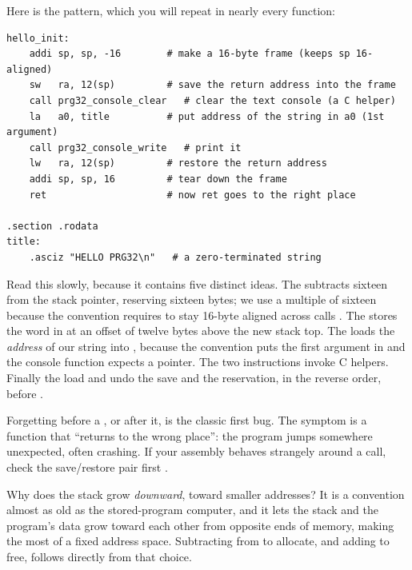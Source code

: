 Here is the pattern, which you will repeat in nearly every function:

\begin{lstlisting}[style=asm,caption={The stack-frame idiom. Save \reg{ra}, do work that may call C, restore \reg{ra}, return.}]
hello_init:
    addi sp, sp, -16        # make a 16-byte frame (keeps sp 16-aligned)
    sw   ra, 12(sp)         # save the return address into the frame
    call prg32_console_clear   # clear the text console (a C helper)
    la   a0, title          # put address of the string in a0 (1st argument)
    call prg32_console_write   # print it
    lw   ra, 12(sp)         # restore the return address
    addi sp, sp, 16         # tear down the frame
    ret                     # now ret goes to the right place

.section .rodata
title:
    .asciz "HELLO PRG32\n"   # a zero-terminated string
\end{lstlisting}

Read this slowly, because it contains five distinct ideas. The  subtracts sixteen from the stack pointer, reserving sixteen bytes; we use a
multiple of sixteen because the convention requires  to stay 16-byte
aligned across calls \citep{prg32abi}. The  stores the word in
 at an offset of twelve bytes above the new stack top. The  loads the \emph{address} of our string into , because the
convention puts the first argument in  and the console function expects a
pointer. The two  instructions invoke C helpers. Finally the load and
 undo the save and the reservation, in the reverse order, before
.

\begin{prgwarn}
Forgetting  before a , or  after it, is the
classic first bug. The symptom is a function that ``returns to the wrong place'':
the program jumps somewhere unexpected, often crashing. If your assembly behaves
strangely around a call, check the  save/restore pair first
\citep{prg32tutorialascii}.
\end{prgwarn}

\begin{prgaside}
Why does the stack grow \emph{downward}, toward smaller addresses? It is a
convention almost as old as the stored-program computer, and it lets the stack
and the program's data grow toward each other from opposite ends of memory,
making the most of a fixed address space. Subtracting from  to allocate,
and adding to free, follows directly from that choice.
\end{prgaside}

